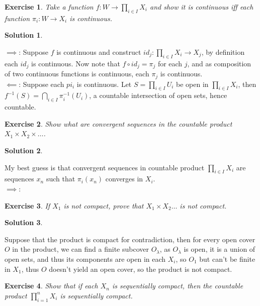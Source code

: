 \documentclass[11pt,a4paper]{article}
\newtheorem{Ex}{Exercise}
\newtheorem{Sol}{Solution}
\begin{document}
\begin{Ex}
	Take a function $f: W \rightarrow \prod_{i \in I}X_i$ and show it is continuous iff each function $\pi_i : W \rightarrow X_i$ is continuous.  
\end{Ex}   

\begin{Sol}\end{Sol}
\noindent $\implies$: Suppose $f$ is continuous and construct $id_j : \prod_{i \in I}X_i \rightarrow X_j$, by definition each $id_j$ is continuous. Now note that $f \circ id_j = \pi_j$ for each $j$, and as composition of two continuous functions is continuous, each $\pi_j$ is continuous.  \\
\noindent$\impliedby$: Suppose each $pi_i$ is continuous. Let $S= \prod_{i \in I}U_i$ be open in $\prod_{i \in I}X_i$, then $f^{-1}(S) = \bigcap_{i \in I}\pi_i^{-1}(U_i)$, a countable intersection of open sets, hence countable.

\begin{Ex}
	Show what are convergent sequences in the countable product $X_1 \times X_2 \times \dots$.
\end{Ex}
\begin{Sol}\end{Sol}
\noindent My best guess is that convergent sequences in countable product $\prod_{i \in I}X_i$ are sequences $x_n$ such that $\pi_i(x_n)$ converges in $X_i$. \\ 
$\implies$:  

\begin{Ex}
	If $X_1$ is not compact, prove that $X_1 \times X_2 \dots$ is not compact.
\end{Ex}
\begin{Sol}\end{Sol}
\noindent Suppose that the product is compact for contradiction, then for every open cover $O$ in the product, we can find a finite subcover $O_\lambda$, as $O_\lambda$ is open, it is a union of open sets, and thus its components are open in each $X_i$, so $O_1$ but  can't be finite in $X_1$, thus $O$ doesn't yield an open cover, so the product is not compact.

\begin{Ex}
	Show that if each $X_n$ is sequentially compact, then the countable product $\prod_{i=1}^{n}X_i$ is sequentially compact.
\end{Ex}  
\end{document}
